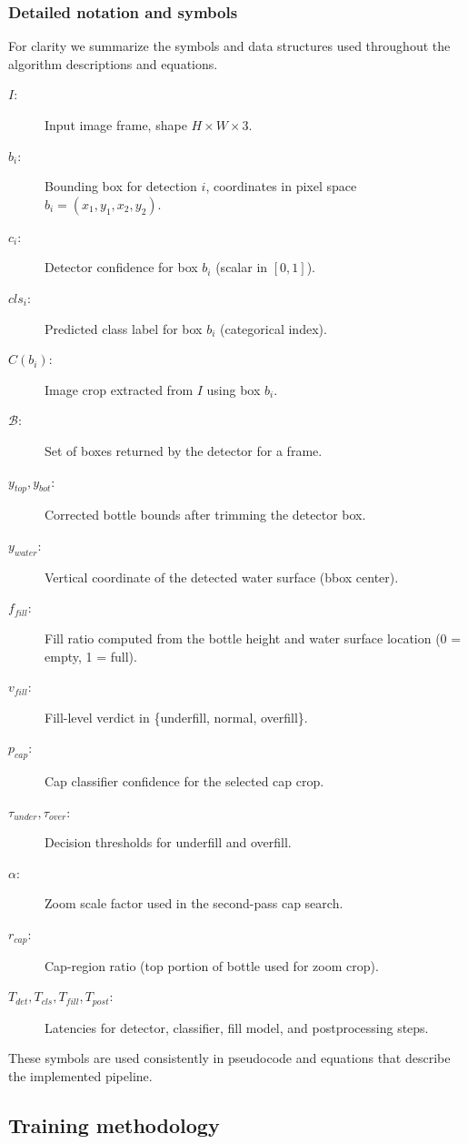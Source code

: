 \documentclass[12pt,a4paper]{report}
\begin{document}
\subsubsection*{Detailed notation and symbols}
For clarity we summarize the symbols and data structures used throughout the algorithm descriptions and equations.
\begin{description}
  \item[$I$:] Input image frame, shape $H\times W\times 3$.
  \item[$b_i$:] Bounding box for detection $i$, coordinates in pixel space $b_i=(x_1,y_1,x_2,y_2)$.
  \item[$c_i$:] Detector confidence for box $b_i$ (scalar in $[0,1]$).
  \item[$cls_i$:] Predicted class label for box $b_i$ (categorical index).
  \item[$C(b_i)$:] Image crop extracted from $I$ using box $b_i$.
  \item[$\mathcal{B}$:] Set of boxes returned by the detector for a frame.
  \item[$y_{top}, y_{bot}$:] Corrected bottle bounds after trimming the detector box.
  \item[$y_{water}$:] Vertical coordinate of the detected water surface (bbox center).
  \item[$f_{fill}$:] Fill ratio computed from the bottle height and water surface location (0 = empty, 1 = full).
  \item[$v_{fill}$:] Fill-level verdict in \{underfill, normal, overfill\}.
  \item[$p_{cap}$:] Cap classifier confidence for the selected cap crop.
  \item[$\tau_{under}, \tau_{over}$:] Decision thresholds for underfill and overfill.
  \item[$\alpha$:] Zoom scale factor used in the second-pass cap search.
  \item[$r_{cap}$:] Cap-region ratio (top portion of bottle used for zoom crop).
  \item[$T_{det}, T_{cls}, T_{fill}, T_{post}$:] Latencies for detector, classifier, fill model, and postprocessing steps.
\end{description}

These symbols are used consistently in pseudocode and equations that describe the implemented pipeline.

\subsection{Training methodology}
\label{subsec:training}
\end{document}
